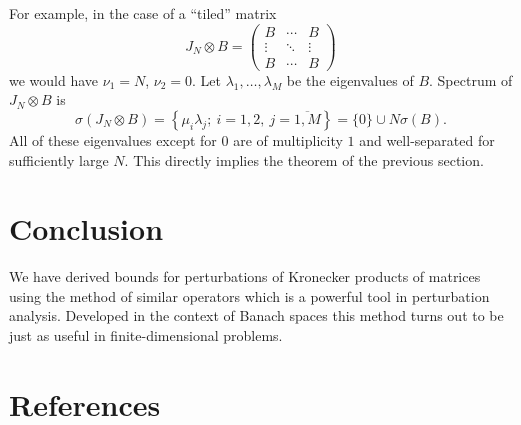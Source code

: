 \documentclass[a4paper]{jpconf}
\begin{document}
For example, in the case of a ``tiled'' matrix
\[
    J_N{\otimes}B =
    \begin{pmatrix}
        B & \cdots & B \\
        \vdots & \ddots & \vdots \\
        B & \cdots & B
    \end{pmatrix}
\]
    we would have
    \( \nu_1=N \),
    \( \nu_2=0 \).
Let \( \lambda_1,\ldots,\lambda_M \)
    be the eigenvalues of \( B \).
Spectrum of \( J_N{\otimes}B \) is
    \[
        \sigma(J_N{\otimes}B) = \left\{ \mu_i\lambda_j;\ i{=}1,2,\ j{=}\overline{1,M}\right\} = \{0\}\cup N\sigma(B).
    \]
All of these eigenvalues except for \( 0 \)
    are of multiplicity \( 1 \)
    and well-separated for sufficiently large \( N \).
This directly implies the theorem of the previous section.
    

\section*{Conclusion}
We have derived bounds
    for perturbations of Kronecker products
    of matrices
    using the method of similar operators
    which is a powerful tool in perturbation analysis.
Developed in the context of Banach spaces
    this method turns out to be just as useful
    in finite-dimensional problems.
\section*{References}

{}
\end{document}
